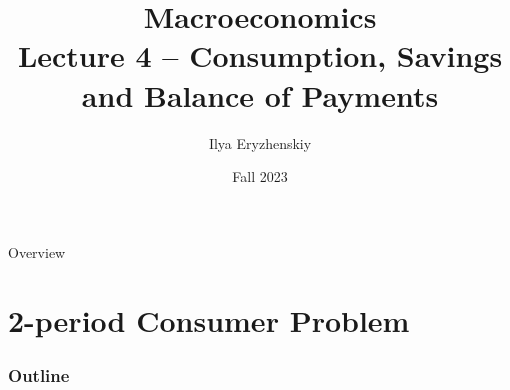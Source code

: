 \documentclass{beamer}
\title[PSME]{Macroeconomics\\ Lecture 4 -- Consumption, Savings and Balance of Payments}
\author[I. Eryzhenskiy]{Ilya Eryzhenskiy}
\institute[BdF]{PSME Panth\'{e}on-Sorbonne Master in Economics}
\date[PSME macro]{Fall 2023}
\begin{document}
\begin{frame}
  \maketitle
\end{frame}

\begin{frame}{Overview}
  \tableofcontents
\end{frame}


\section{2-period Consumer Problem}
\begin{frame}
\frametitle{Outline}
\tableofcontents[currentsection]
\end{frame}
\end{document}
